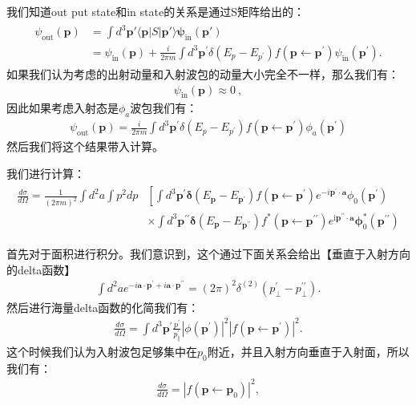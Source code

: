 我们知道out put state和in state的关系是通过S矩阵给出的：
\begin{align}
  \begin{aligned}\psi_\mathrm{out}(\mathbf{p})&=\int
    d^3\mathbf{p}'\langle\mathbf{p}|S|\mathbf{p}'\rangle\boldsymbol{\psi}_{\mathrm{in}}(\mathbf{p}')\\&=\psi_{\mathrm{in}}(\mathbf{p})+\frac
    i{2\pi m}\int
    d^3\mathbf{p}^{\prime}\delta(E_p-E_{p^{\prime}})f(\mathbf{p}\leftarrow\mathbf{p}^{\prime})\psi_{\mathrm{in}}(\mathbf{p}^{\prime})
    .
  \end{aligned}
\end{align}
如果我们认为考虑的出射动量和入射波包的动量大小完全不一样，那么我们有：
\begin{align}
  \psi_{\text{in}}(\mathbf{p})\approx 0\mathrm{~,}
\end{align}
因此如果考虑入射态是$ \phi_a $波包我们有：
\begin{align}
  \psi_{\text{out}}(\mathbf{p}) = \frac i{2\pi m}\int
  d^3\mathbf{p}^{\prime}\delta(E_p-E_{p^{\prime}})f(\mathbf{p}\leftarrow\mathbf{p}^{\prime})\phi_a(\mathbf{p}^{\prime})
\end{align}
然后我们将这个结果带入计算。

\bigskip
{}

我们进行计算：
\begin{align}
  \begin{aligned}\frac{d\sigma}{d\Omega}=\frac{1}{(2\pi m)^2}\int
    d^2a\int p^2dp&\left[\int
      d^3\mathbf{p}^{\prime}\boldsymbol{\delta}\left(E_\mathbf{p}-E_{\mathbf{p}^{\prime}}\right)f\left(\mathbf{p}\leftarrow\mathbf{p}^{\prime}\right)e^{-i\mathbf{p}^{\prime}\cdot\mathbf{a}}\phi_0(\mathbf{p}^{\prime})\right.\\&\times\int
      d^3\mathbf{p}^{\prime\prime}\boldsymbol{\delta}\left(E_\mathbf{p}-E_{\mathbf{p}^{\prime\prime}}\right)f^*\left(\mathbf{p}\leftarrow\mathbf{p}^{\prime\prime}\right)e^{\mathrm{i}\mathbf{p}^{\prime\prime}\cdot\mathbf{a}}\boldsymbol{\phi}_0^*(\mathbf{p}^{\prime\prime})
    \end{aligned}
  \end{align}

  首先对于面积进行积分。我们意识到，这个通过下面关系会给出【垂直于入射方向的delta函数】
  \begin{align}
    \int
    d^2ae^{-i\mathbf{a}\cdot\mathbf{p}^{\prime}+i\mathbf{a}\cdot\mathbf{p}^{\prime\prime}}=(2\pi)^2\delta^{(2)}\left(p_\perp^{\prime}-p_\perp^{\prime\prime}\right).
  \end{align}
  然后进行海量delta函数的化简我们有：
  \begin{align}
    \frac{d\sigma}{d \Omega}=\int
    d^3\mathbf{p}^{\prime}\frac{p^{\prime}}{p_\parallel^{\prime}}\left|\phi(\mathbf{p}^{\prime})\right|^2\left|f\left(\mathbf{p}\leftarrow\mathbf{p}^{\prime}\right)\right|^2.
  \end{align}
  这个时候我们认为入射波包足够集中在$ p_0 $附近，并且入射方向垂直于入射面，所以我们有：
  \begin{align}
    \frac{d\sigma}{d\Omega}=|f\left(\mathbf{p}\leftarrow\mathbf{p}_0\right)|^2,
  \end{align}

